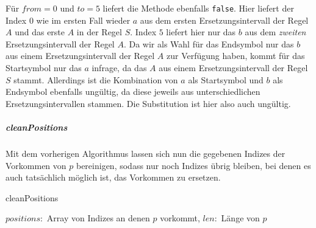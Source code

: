 Für $from=0$ und $to=5$ liefert die Methode ebenfalls \texttt{false}. Hier liefert der Index $0$ wie im ersten Fall wieder $a$ aus dem ersten Ersetzungsintervall der Regel $A$ und das erste $A$ in der Regel $S$. Index $5$ liefert hier nur das $b$ aus dem \textit{zweiten} Ersetzungsintervall der Regel $A$. 
Da wir als Wahl für das Endsymbol nur das $b$ aus einem Ersetzungsintervall der Regel $A$ zur Verfügung haben, kommt für das Startsymbol nur das $a$ infrage, da das $A$ aus einem Ersetzungsintervall der Regel $S$ stammt.
Allerdings ist die Kombination von $a$ als Startsymbol und $b$ als Endsymbol ebenfalls ungültig, da diese jeweils aus unterschiedlichen Ersetzungsintervallen stammen.
Die Substitution ist hier also auch ungültig.

\subparagraph{cleanPositions}

Mit dem vorherigen Algorithmus lassen sich nun die gegebenen Indizes der Vorkommen von $p$ bereinigen, sodass nur noch Indizes übrig bleiben, bei denen es auch tatsächlich möglich ist, das Vorkommen zu ersetzen.  

\begin{algorithm}
    \begin{algorithmic}
        \caption{cleanPositions}
        \REQUIRE $positions: $ Array von Indizes an denen $p$ vorkommt, $len: $ Länge von $p$
    \end{algorithmic}
\end{algorithm}